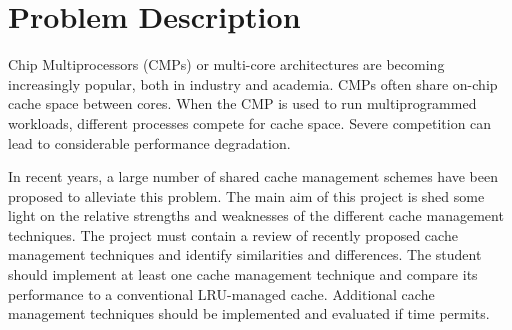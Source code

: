 
\section*{Problem Description}
Chip Multiprocessors (CMPs) or multi-core architectures are becoming increasingly popular, both in industry and academia. 
CMPs often share on-chip cache space between cores. 
When the CMP is used to run multiprogrammed workloads, different processes compete for cache space. 
Severe competition can lead to considerable performance degradation. 

In recent years, a large number of shared cache management schemes have been proposed to alleviate this problem.
The main aim of this project is shed some light on the relative strengths and weaknesses of the different cache management techniques. 
The project must contain a review of recently proposed cache management techniques and identify similarities and differences. 
The student should implement at least one cache management technique and compare its performance to a conventional LRU-managed cache.
Additional cache management techniques should be implemented and evaluated if time permits.

\clearpage